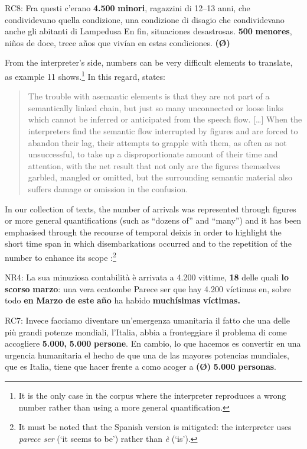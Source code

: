 \documentclass[output=paper]{langscibook}
\begin{document}
\ea\label{ex:mori:11}
\ea
RC8: Fra questi c'erano \textbf{4.500} \textbf{minori}, ragazzini di 12--13 anni, che condividevano quella condizione, una condizione di disagio che condividevano anche gli abitanti di Lampedusa
\ex
En fin, situaciones desastrosas. \textbf{500} \textbf{menores}, niños de doce, trece años que vivían en estas condiciones. \textbf{(Ø)}
\z
\z

From the interpreter’s side, numbers can be very difficult elements to translate, as example 11 shows.\footnote{It is the only case in the corpus where the interpreter reproduces a wrong number rather than using a more general quantification.} In this regard, \citet[19--20]{Pearl1999} states: 

\begin{quote}
The trouble with asemantic elements is that they are not part of a semantically linked chain, but just so many unconnected or loose links which cannot be inferred or anticipated from the speech flow. [\ldots] When the interpreters find the semantic flow interrupted by figures and are forced to abandon their lag, their attempts to grapple with them, as often as not unsuccessful, to take up a disproportionate amount of their time and attention, with the net result that not only are the figures themselves garbled, mangled or omitted, but the surrounding semantic material also suffers damage or omission in the confusion.
\end{quote}

In our collection of texts, the number of arrivals was represented through figures or more general quantifications (such as “dozens of” and “many”) and it has been emphasised through the recourse of temporal deixis in order to highlight the short time span in which disembarkations occurred  and to the repetition of the number to enhance its scope :\footnote{It must be noted that the Spanish version is mitigated: the interpreter uses \textit{parece ser} (‘it seems to be’) rather than \textit{è} (‘is’).}

\ea\label{ex:mori:12}
\ea
NR4: La sua minuziosa contabilità è arrivata a 4.200 vittime, \textbf{18} delle quali \textbf{lo} \textbf{scorso} \textbf{marzo}: una vera ecatombe
\ex
Parece ser que hay 4.200 víctimas en, sobre todo \textbf{en} \textbf{Marzo} \textbf{de} \textbf{este} \textbf{año} ha habido \textbf{muchísimas} \textbf{víctimas.}
\z
\z

\ea\label{ex:mori:13}
\ea
RC7: Invece facciamo diventare un’emergenza umanitaria il fatto che una delle più grandi potenze mondiali, l'Italia, abbia a fronteggiare il problema di come accogliere \textbf{5.000,} \textbf{5.000} \textbf{persone}.
\ex
En cambio, lo que hacemos es convertir en una urgencia humanitaria el hecho de que una de las mayores potencias mundiales, que es Italia, tiene que hacer frente a como acoger a \textbf{(Ø)} \textbf{5.000} \textbf{personas}.
\z
\z
\end{document}

